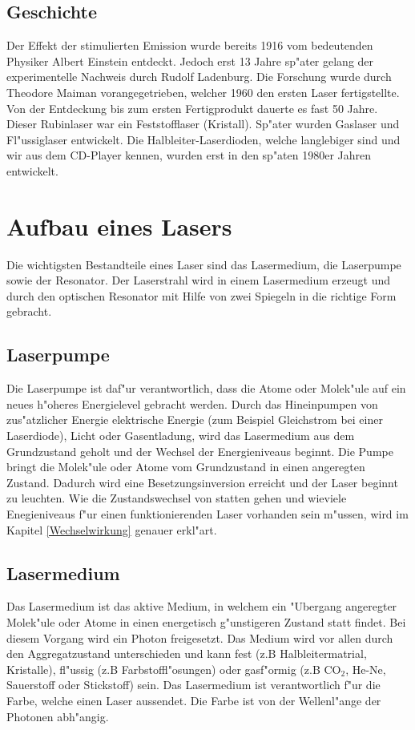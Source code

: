 \begin{refsection}
\subsection{Geschichte}
Der Effekt der stimulierten Emission wurde bereits 1916 vom bedeutenden 
Physiker Albert Einstein entdeckt. Jedoch erst 13 Jahre sp"ater gelang der 
experimentelle Nachweis durch Rudolf Ladenburg. Die Forschung wurde durch 
Theodore Maiman vorangegetrieben, welcher 1960 den ersten Laser 
fertigstellte. Von der Entdeckung bis zum ersten Fertigprodukt dauerte es 
fast 50 Jahre. Dieser Rubinlaser war ein Feststofflaser (Kristall). Sp"ater 
wurden Gaslaser und Fl"ussiglaser entwickelt. Die Halbleiter-Laserdioden, 
welche langlebiger sind und wir aus dem CD-Player kennen, wurden erst in den 
sp"aten 1980er Jahren entwickelt.

\section{Aufbau eines Lasers}
Die wichtigsten Bestandteile eines Laser sind das Lasermedium, die Laserpumpe sowie
der Resonator. Der Laserstrahl wird in einem Lasermedium erzeugt und 
durch den optischen Resonator mit Hilfe von zwei Spiegeln in die richtige 
Form gebracht. 

\subsection{Laserpumpe}
Die Laserpumpe ist daf"ur verantwortlich, dass die Atome oder Molek"ule auf 
ein neues h"oheres Energielevel gebracht werden. Durch das Hineinpumpen von 
zus"atzlicher Energie elektrische Energie
(zum Beispiel Gleichstrom bei einer Laserdiode), Licht oder 
Gasentladung, wird das Lasermedium aus dem Grundzustand 
geholt und der Wechsel der Energieniveaus beginnt. Die Pumpe bringt die 
Molek"ule oder Atome vom Grundzustand in einen angeregten Zustand. Dadurch 
wird eine Besetzungsinversion erreicht und der Laser beginnt zu leuchten. Wie 
die Zustandswechsel von statten gehen und wieviele Enegieniveaus f"ur einen funktionierenden Laser vorhanden
sein m"ussen, wird im Kapitel \ref{Wechselwirkung} genauer erkl"art.

\subsection{Lasermedium}
Das Lasermedium ist das aktive Medium, in welchem ein "Ubergang angeregter 
Molek"ule oder Atome in einen energetisch g"unstigeren Zustand statt findet. 
Bei diesem Vorgang wird ein Photon freigesetzt.
Das Medium wird vor allen durch den Aggregatzustand 
unterschieden und kann fest (z.B Halbleitermatrial, Kristalle), fl"ussig (z.B 
Farbstoffl"osungen) oder gasf"ormig (z.B $\text{CO}_{2}$, He-Ne, Sauerstoff oder 
Stickstoff) sein. Das Lasermedium ist verantwortlich f"ur die Farbe, welche
einen Laser aussendet.
Die Farbe ist von der Wellenl"ange der Photonen abh"angig.


\end{refsection}
